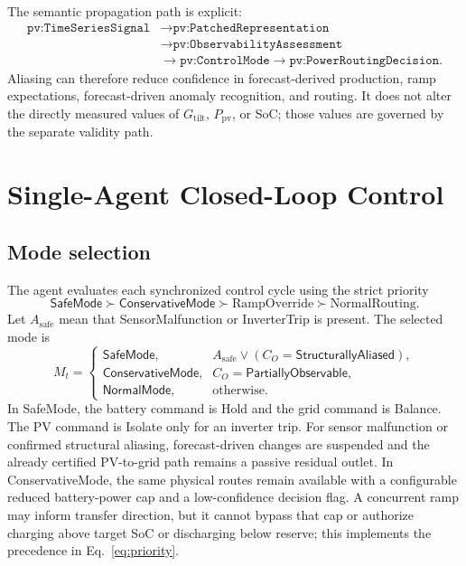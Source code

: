 \documentclass[
	letterpaper,
	10pt,
	unnumberedsections,
	twoside,
]{LTJournalArticle}
\newcommand{\pv}[1]{\texttt{pv:#1}}
\newcommand{\valueof}[1]{\textsf{#1}}
\begin{document}
The semantic propagation path is explicit:
\begin{equation}
\begin{aligned}
\pv{TimeSeriesSignal}
&\longrightarrow \pv{PatchedRepresentation}\\
&\longrightarrow \pv{ObservabilityAssessment}\\
&\longrightarrow \pv{ControlMode}
\longrightarrow \pv{PowerRoutingDecision}.
\end{aligned}
\label{eq:semantic-path}
\end{equation}
Aliasing can therefore reduce confidence in forecast-derived production, ramp expectations, forecast-driven anomaly recognition, and routing. It does not alter the directly measured values of $G_{\mathrm{tilt}}$, $P_{\mathrm{pv}}$, or SoC; those values are governed by the separate validity path.

\section{Single-Agent Closed-Loop Control}

\subsection{Mode selection}

The agent evaluates each synchronized control cycle using the strict priority
\begin{equation}
\valueof{SafeMode}\succ
\valueof{ConservativeMode}\succ
\mathrm{RampOverride}\succ
\mathrm{NormalRouting}.
\label{eq:priority}
\end{equation}
Let $A_{\mathrm{safe}}$ mean that \valueof{SensorMalfunction} or \valueof{InverterTrip} is present. The selected mode is
\begin{equation}
M_t=
\begin{cases}
\valueof{SafeMode}, & A_{\mathrm{safe}}\vee
(C_O=\valueof{StructurallyAliased}),\\
\valueof{ConservativeMode}, & C_O=\valueof{PartiallyObservable},\\
\valueof{NormalMode}, & \text{otherwise}.
\end{cases}
\label{eq:mode-selection}
\end{equation}
In \valueof{SafeMode}, the battery command is Hold and the grid command is Balance. The PV command is Isolate only for an inverter trip. For sensor malfunction or confirmed structural aliasing, forecast-driven changes are suspended and the already certified PV-to-grid path remains a passive residual outlet. In \valueof{ConservativeMode}, the same physical routes remain available with a configurable reduced battery-power cap and a low-confidence decision flag. A concurrent ramp may inform transfer direction, but it cannot bypass that cap or authorize charging above target SoC or discharging below reserve; this implements the precedence in Eq.~\eqref{eq:priority}.
\end{document}
